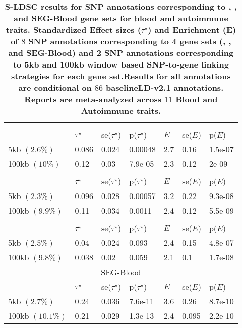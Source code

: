 \newpage
\begin{table}[h]
\centering
\caption{\bf{S-LDSC results for SNP annotations corresponding to \Robospan{}, \pRobospan{}, \Corspan{} and SEG-Blood gene sets for blood and autoimmune traits. Standardized Effect sizes ($\tau^{\star}$) and Enrichment (E) of $8$ SNP annotations corresponding to 4 gene sets (\Robospan{}, \pRobospan{}, \Corspan{} and SEG-Blood\cite{Finucane2018}) and 2 SNP annotations corresponding to 5kb and 100kb window based SNP-to-gene linking strategies for each gene set.Results for all annotations are conditional on $86$ baselineLD-v2.1 annotations. Reports are meta-analyzed across $11$ Blood and Autoimmune traits.}}
\label{tab:Robocov_marginal} 
\begin{tabular}[c]{|p{2cm}|p{1cm}|p{0.8cm}|p{1.3cm}|p{0.5cm}|p{1cm}|p{1.3cm}|}
 \multicolumn{7}{c}{\Robospan{}}  \\ \hline
& $\tau^{\star}$ & se($\tau^{\star}$) & p($\tau^{\star}$) & $E$ & se($E$) & p($E$) \\
\hline
\multirow{1}{16em}{5kb $(2.6\%)$} & 0.086 & 0.024 & 0.00048 & 2.7 & 0.16 & 1.5e-07 \\
\multirow{1}{16em}{100kb $(10\%)$} & 0.12 & 0.03 & 7.9e-05 & 2.3 & 0.12 & 2e-09 \\
\hline 
 \multicolumn{7}{c}{\pRobospan{}}  \\ \hline
 & $\tau^{\star}$ & se($\tau^{\star}$) & p($\tau^{\star}$) & $E$ & se($E$) & p($E$) \\
\hline
\multirow{1}{16em}{5kb $(2.3\%)$} & 0.096 & 0.028 & 0.00057 & 3.2 & 0.22 & 9.3e-08 \\
\multirow{1}{16em}{100kb $(9.9\%)$} & 0.11 & 0.034 & 0.0011 & 2.4 & 0.12 & 5.5e-09 \\
\hline 
\multicolumn{7}{c}{\Corspan{}}  \\ \hline
 & $\tau^{\star}$ & se($\tau^{\star}$) & p($\tau^{\star}$) & $E$ & se($E$) & p($E$) \\
\hline
\multirow{1}{16em}{5kb $(2.5\%)$} & 0.04 & 0.024 & 0.093 & 2.4 & 0.15 & 4.8e-07 \\
\multirow{1}{16em}{100kb $(9.8\%)$} & 0.038 & 0.02 & 0.059 & 2.1 & 0.1 & 1.7e-08 \\
 \hline 
\multicolumn{7}{c}{SEG-Blood}  \\ \hline
 & $\tau^{\star}$ & se($\tau^{\star}$) & p($\tau^{\star}$) & $E$ & se($E$) & p($E$) \\
\hline
\multirow{1}{16em}{5kb $(2.7\%)$} & 0.24 & 0.036 & 7.6e-11 & 3.6 & 0.26 & 8.7e-10 \\
\multirow{1}{16em}{100kb $(10.1\%)$} & 0.21 & 0.029 & 1.3e-13 & 2.4 & 0.095 & 2.2e-10 \\
 \hline
\end{tabular}
\end{table}


